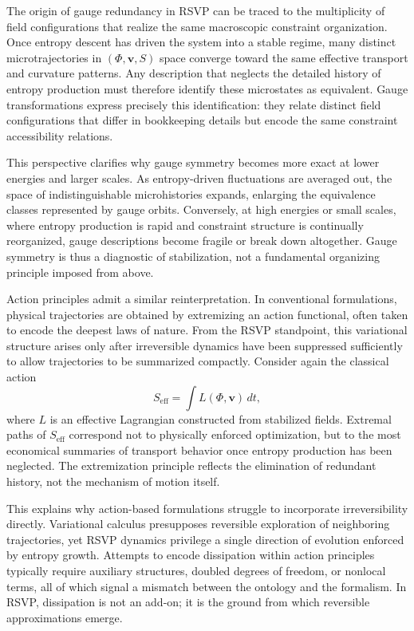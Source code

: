 \documentclass[11pt]{article}
\begin{document}
The origin of gauge redundancy in RSVP can be traced to the multiplicity of field configurations that realize the same macroscopic constraint organization. Once entropy descent has driven the system into a stable regime, many distinct microtrajectories in $(\Phi, \mathbf{v}, S)$ space converge toward the same effective transport and curvature patterns. Any description that neglects the detailed history of entropy production must therefore identify these microstates as equivalent. Gauge transformations express precisely this identification: they relate distinct field configurations that differ in bookkeeping details but encode the same constraint accessibility relations.

This perspective clarifies why gauge symmetry becomes more exact at lower energies and larger scales. As entropy-driven fluctuations are averaged out, the space of indistinguishable microhistories expands, enlarging the equivalence classes represented by gauge orbits. Conversely, at high energies or small scales, where entropy production is rapid and constraint structure is continually reorganized, gauge descriptions become fragile or break down altogether. Gauge symmetry is thus a diagnostic of stabilization, not a fundamental organizing principle imposed from above.

Action principles admit a similar reinterpretation. In conventional formulations, physical trajectories are obtained by extremizing an action functional, often taken to encode the deepest laws of nature. From the RSVP standpoint, this variational structure arises only after irreversible dynamics have been suppressed sufficiently to allow trajectories to be summarized compactly. Consider again the classical action
\begin{equation}
S_{\text{eff}} = \int L(\Phi, \mathbf{v}) \, dt,
\end{equation}
where $L$ is an effective Lagrangian constructed from stabilized fields. Extremal paths of $S_{\text{eff}}$ correspond not to physically enforced optimization, but to the most economical summaries of transport behavior once entropy production has been neglected. The extremization principle reflects the elimination of redundant history, not the mechanism of motion itself.

This explains why action-based formulations struggle to incorporate irreversibility directly. Variational calculus presupposes reversible exploration of neighboring trajectories, yet RSVP dynamics privilege a single direction of evolution enforced by entropy growth. Attempts to encode dissipation within action principles typically require auxiliary structures, doubled degrees of freedom, or nonlocal terms, all of which signal a mismatch between the ontology and the formalism. In RSVP, dissipation is not an add-on; it is the ground from which reversible approximations emerge.
\end{document}
